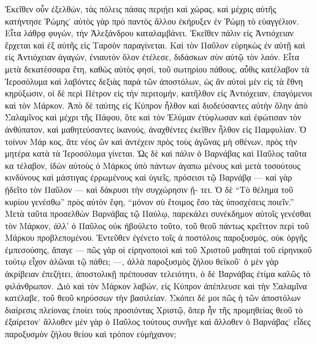 Ἐκεῖθεν οὖν ἐξελθών, τὰς πόλεις πάσας περιῄει καὶ
χώρας, καὶ μέχρις αὐτῆς κατήντησε Ῥώμης˙ αὐτὸς γὰρ
πρὸ παντὸς ἄλλου ἐκήρυξεν ἐν Ῥώμῃ τὸ εὐαγγέλιον.
Εἶτα λάθρᾳ φυγών, τὴν Ἀλεξάνδρου καταλαμβάνει. Ἐκεῖθεν
πάλιν εἰς Ἀντιόχειαν ἔρχεται καὶ ἐξ αὐτῆς εἰς Ταρσὸν
παραγίνεται. Καὶ τὸν Παῦλον εὑρηκὼς ἐν αὐτῇ καὶ εἰς
Ἀντιόχειαν ἀγαγών, ἐνιαυτὸν ὅλον ἐτέλεσε, διδάσκων
σὺν αὐτῷ τὸν λαόν. Εἶτα μετὰ δεκατέσσαρα ἔτη, καθὼς
αὐτὸς φησί, τοῦ σωτηρίου πάθους, αὖθις κατέλαβον τὰ
Ἱεροσόλυμα καὶ λαβόντες δεξιὰς παρὰ τῶν ἀποστόλων,
ὡς ἂν αὐτοὶ μὲν εἰς τὰ ἔθνη κηρύξωσιν, οἱ δὲ περὶ
Πέτρον εἰς τὴν περιτομήν, κατῆλθον εἰς Ἀντιόχειαν,
ἐπαγόμενοι καὶ τὸν Μάρκον. Ἀπὸ δὲ ταύτης εἰς Κύπρον
ἦλθον καὶ διοδεύσαντες αὐτὴν ὅλην ἀπὸ Σαλαμῖνος καὶ
μέχρι τῆς Πάφου, ὅτε καὶ τὸν Ἐλύμαν ἐτύφλωσαν καὶ
ἐφώτισαν τὸν ἀνθύπατον, καὶ μαθητεύσαντες ἱκανούς,
ἀναχθέντες ἐκεῖθεν ἦλθον εἰς Παμφυλίαν. Ὁ τοίνυν Μάρ%
κος, ἅτε νέος ὢν καὶ ἀντέχειν πρὸς τοὺς ἀγῶνας μὴ
σθένων, πρὸς τὴν μητέρα κατὰ τὰ Ἱεροσόλυμα γίνεται.
Ὡς δὲ καὶ πάλιν ὁ Βαρνάβας καὶ Παῦλος ταῦτα κα%
τέλαβον, ἰδὼν αὐτοὺς ὁ Μάρκος ὑπὸ πάντων ἀγαπω%
μένους καὶ μετὰ τοσούτους κινδύνους καὶ μάστιγας
ἐρρωμένους καὶ ὑγιεῖς, πρόσεισι τῷ Βαρνάβᾳ --- καὶ γὰρ
ᾐδεῖτο τὸν Παῦλον --- καὶ δάκρυσι τὴν συγχώρησιν ᾔ-
τει. Ὁ δὲ \enquote{Τὸ θέλημα τοῦ κυρίου γενέσθω} πρὸς αὐτὸν
ἔφη, \enquote{μόνον σὺ ἕτοιμος ἔσο τὰς ὑποσχέσεις ποιεῖν.}
Μετὰ ταῦτα προσελθὼν Βαρνάβας τῷ Παύλῳ, παρεκάλει
συνέκδημον αὐτοῖς γενέσθαι τὸν Μάρκον, ἀλλ’ ὁ Παῦλος
οὐκ ἠβούλετο τοῦτο, τοῦ θεοῦ πάντως κρεῖττον περὶ
τοῦ Μάρκου προβλεπομένου. Ἐντεῦθεν ἐγένετο τοῖς ἀ%
ποστόλοις παροξυσμός, οὐκ ὀργῆς ἐμπεσούσης, ἄπαγε
 --- πῶς γὰρ οἱ εἰρηνοποιοὶ καὶ τοῦ Χριστοῦ μαθηταὶ
τοῦ εἰρηνικοῦ τούτῳ εἶχον ἁλῶναι τῷ πάθει;  ---, ἀλλὰ
παροξυσμὸς ζήλου θεϊκοῦ˙ ὁ μὲν γὰρ ἀκρίβειαν ἐπεζήτει,
ἀποστολικῇ πρέπουσαν τελειότητι, ὁ δὲ Βαρνάβας ἐτίμα
καλῶς τὸ φιλάνθρωπον. Διὸ καὶ τὸν Μάρκον λαβών,
εἰς Κύπρον ἀπέπλευσε καὶ τὴν Σαλαμῖνα κατέλαβε, τοῦ
θεοῦ κηρύσσων τὴν βασιλείαν. Σκόπει δέ μοι πῶς ἡ
τῶν ἀποστόλων διαίρεσις πλείονας ἐποίει τοὺς προσιόντας
Χριστῷ, ὅπερ ἦν τῆς προμηθείας θεοῦ τὸ ἐξαίρετον˙
ἄλλοθεν μὲν γὰρ ὁ Παῦλος τούτους συνῆγε καὶ ἄλλοθεν
ὁ Βαρνάβας˙ εἶδες παροξυσμὸν ζήλου θείου καὶ τρόπον
εὐμήχανον;


